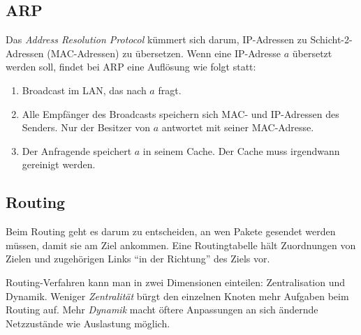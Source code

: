 \documentclass[a4paper,parskip=half*,DIV=15,fontsize=11pt]{scrartcl}
\begin{document}
\subsection{ARP}

Das \emph{Address Resolution Protocol} kümmert sich darum, IP-Adressen zu Schicht-2-Adressen (MAC-Adressen) zu übersetzen. Wenn eine IP-Adresse $a$ übersetzt werden soll, findet bei ARP eine Auflösung wie folgt statt:

\begin{enumerate}
\item Broadcast im LAN, das nach $a$ fragt.
\item Alle Empfänger des Broadcasts speichern sich MAC- und IP-Adressen des Senders. Nur der Besitzer von $a$ antwortet mit seiner MAC-Adresse.
\item Der Anfragende speichert $a$ in seinem Cache. Der Cache muss irgendwann gereinigt werden.
\end{enumerate}

\subsection{Routing}

Beim Routing geht es darum zu entscheiden, an wen Pakete gesendet werden müssen, damit sie am Ziel ankommen. Eine Routingtabelle hält Zuordnungen von Zielen und zugehörigen Links ``in der Richtung'' des Ziels vor.

Routing-Verfahren kann man in zwei Dimensionen einteilen: Zentralisation und Dynamik. Weniger \emph{Zentralität} bürgt den einzelnen Knoten mehr Aufgaben beim Routing auf. Mehr \emph{Dynamik} macht öftere Anpassungen an sich ändernde Netzzustände wie Auslastung möglich.
\end{document}
